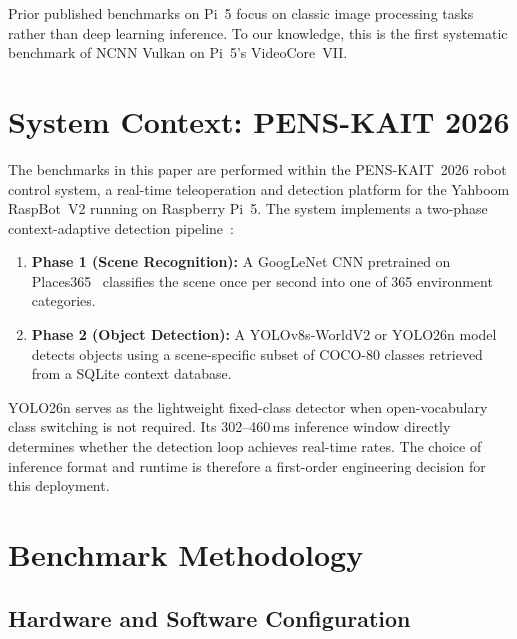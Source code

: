 \documentclass[conference]{IEEEtran}
\begin{document}
Prior published benchmarks on Pi~5 focus on classic image processing
tasks~\cite{pi5bench2024} rather than deep learning inference. To our knowledge,
this is the first systematic benchmark of NCNN Vulkan on Pi~5's VideoCore~VII.

\section{System Context: PENS-KAIT 2026}

The benchmarks in this paper are performed within the PENS-KAIT~2026 robot
control system, a real-time teleoperation and detection platform for the Yahboom
RaspBot~V2 running on Raspberry Pi~5. The system implements a two-phase
context-adaptive detection pipeline~\cite{mukhayyar2026pipeline}:

\begin{enumerate}
  \item \textbf{Phase 1 (Scene Recognition):} A GoogLeNet CNN
        pretrained on Places365~\cite{zhou2018places} classifies the scene
        once per second into one of 365 environment categories.
  \item \textbf{Phase 2 (Object Detection):} A YOLOv8s-WorldV2 or
        YOLO26n model detects objects using a scene-specific subset
        of COCO-80 classes retrieved from a SQLite context database.
\end{enumerate}

YOLO26n serves as the lightweight fixed-class detector when open-vocabulary
class switching is not required. Its 302--460\,ms inference window directly
determines whether the detection loop achieves real-time rates. The choice
of inference format and runtime is therefore a first-order engineering decision
for this deployment.

\section{Benchmark Methodology}

\subsection{Hardware and Software Configuration}
\end{document}
